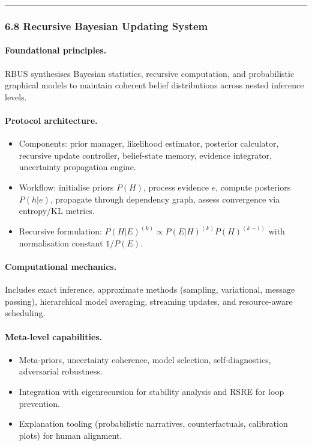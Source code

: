 \documentclass[12pt]{article}
\begin{document}
\begin{center}\rule{0.5\linewidth}{0.5pt}\end{center}

\subsubsection{\texorpdfstring{\textbf{6.8 Recursive Bayesian Updating System}}{6.8 Recursive Bayesian Updating System}}\label{rbus-framework}

\paragraph{Foundational principles.}
RBUS synthesises Bayesian statistics, recursive computation, and probabilistic graphical models to maintain coherent belief distributions across nested inference levels.

\paragraph{Protocol architecture.}
\begin{itemize}
\item Components: prior manager, likelihood estimator, posterior calculator, recursive update controller, belief-state memory, evidence integrator, uncertainty propagation engine.
\item Workflow: initialise priors $P(H)$, process evidence $e$, compute posteriors $P(h|e)$, propagate through dependency graph, assess convergence via entropy/KL metrics.
\item Recursive formulation: $P(H|E)^{(k)} \propto P(E|H)^{(k)} P(H)^{(k-1)}$ with normalisation constant $1/P(E)$.
\end{itemize}

\paragraph{Computational mechanics.}
Includes exact inference, approximate methods (sampling, variational, message passing), hierarchical model averaging, streaming updates, and resource-aware scheduling.

\paragraph{Meta-level capabilities.}
\begin{itemize}
\item Meta-priors, uncertainty coherence, model selection, self-diagnostics, adversarial robustness.
\item Integration with eigenrecursion for stability analysis and RSRE for loop prevention.
\item Explanation tooling (probabilistic narratives, counterfactuals, calibration plots) for human alignment.
\end{itemize}
\end{document}
